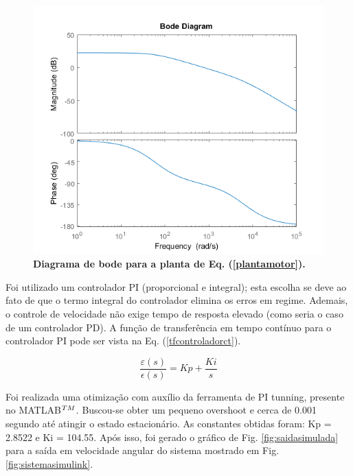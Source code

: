 \documentclass[10pt,fleqn,a4paper]{article}
\begin{document}
	\begin{figure}[ht]
		\begin{center}
			\includegraphics[angle=0, scale=0.7]{images/bode}
		\end{center}
		\caption{\textbf{Diagrama de bode para a planta de Eq. (\ref{plantamotor}).}}
		\label{fig:bode}
	\end{figure}
    
    Foi utilizado um controlador PI (proporcional e integral); esta escolha se deve ao fato de que o termo integral do controlador elimina os erros em regime. Ademais, o controle de velocidade não exige tempo de resposta elevado (como seria o caso de um controlador PD). A função de transferência em tempo contínuo para o controlador PI pode ser vista na Eq. (\ref{tfcontroladorct}).
    
    \begin{equation}
    \frac{\varepsilon(s)}{\epsilon(s)}= Kp + \frac{Ki}{s} \label{tfcontroladorct}
    \end{equation}
    
    Foi realizada uma otimização com auxílio da ferramenta de PI tunning, presente no MATLAB$^{\small{TM}}$. Buscou-se obter um pequeno overshoot e cerca de 0.001 segundo até atingir o estado estacionário. As constantes obtidas foram: Kp = 2.8522 e Ki = 104.55. Após isso, foi gerado o gráfico de Fig. \ref{fig:saidasimulada} para a saída em velocidade angular do sistema mostrado em Fig.  \ref{fig:sistemasimulink}.
    
\end{document}
